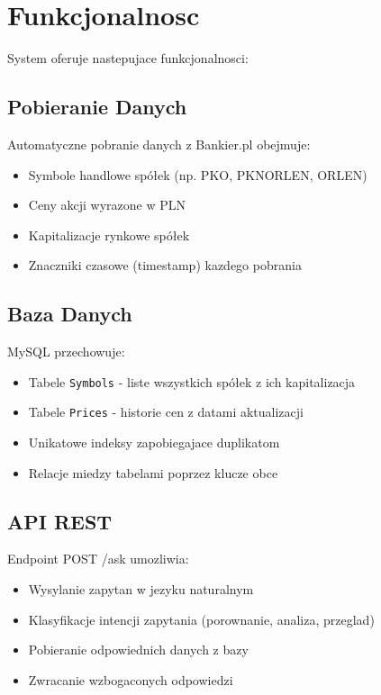 \documentclass[11pt,a4paper]{article}
\begin{document}
\section{Funkcjonalnosc}

System oferuje nastepujace funkcjonalnosci:

\subsection{Pobieranie Danych}

Automatyczne pobranie danych z Bankier.pl obejmuje:
\begin{itemize}
    \item Symbole handlowe spółek (np. PKO, PKNORLEN, ORLEN)
    \item Ceny akcji wyrazone w PLN
    \item Kapitalizacje rynkowe spółek
    \item Znaczniki czasowe (timestamp) kazdego pobrania
\end{itemize}

\subsection{Baza Danych}

MySQL przechowuje:
\begin{itemize}
    \item Tabele \texttt{Symbols} - liste wszystkich spółek z ich kapitalizacja
    \item Tabele \texttt{Prices} - historie cen z datami aktualizacji
    \item Unikatowe indeksy zapobiegajace duplikatom
    \item Relacje miedzy tabelami poprzez klucze obce
\end{itemize}

\subsection{API REST}

Endpoint POST /ask umozliwia:
\begin{itemize}
    \item Wysylanie zapytan w jezyku naturalnym
    \item Klasyfikacje intencji zapytania (porownanie, analiza, przeglad)
    \item Pobieranie odpowiednich danych z bazy
    \item Zwracanie wzbogaconych odpowiedzi
\end{itemize}
\end{document}
